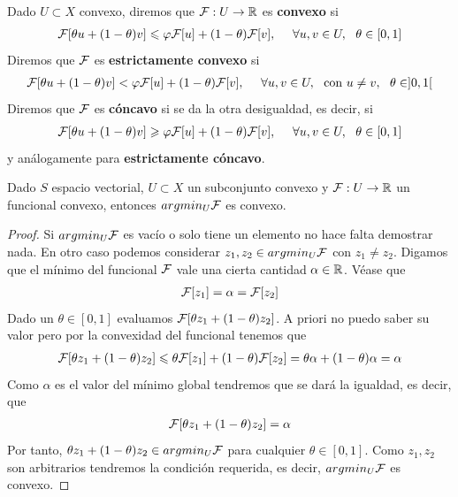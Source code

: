 \begin{definicion}
    Dado $U\subset X$ convexo, diremos que $\mathcal{F}:U\to \mathbb{R}$ es \textbf{convexo} si 
    \begin{gather*}
        \mathcal{F}[\theta u + (1-\theta)v] \leqslant \varphi \mathcal{F}[u] + (1-\theta)\mathcal{F}[v],\ \ \ \ \forall u,v\in U,\ \ \theta \in [0,1]
    \end{gather*}
    Diremos que $\mathcal{F}$ es \textbf{estrictamente convexo} si
    \begin{gather*}
        \cc{F}[\theta u + (1-\theta)v] < \varphi \cc{F}[u] + (1-\theta)\cc{F}[v],\ \ \ \ \forall u,v\in U,\ \text{ con } u\neq v,\ \ \theta \in ]0,1[
    \end{gather*}
    Diremos que $\mathcal{F}$ es \textbf{cóncavo} si se da la otra desigualdad, es decir, si
    \begin{gather*}
        \mathcal{F}[\theta u + (1-\theta)v] \geqslant \varphi \mathcal{F}[u] + (1-\theta)\mathcal{F}[v],\ \ \ \ \forall u,v\in U,\ \ \theta \in [0,1]
    \end{gather*}
    y análogamente para \textbf{estrictamente cóncavo}.
\end{definicion}

\begin{lema}
    Dado $S$ espacio vectorial, $U\subset X$ un subconjunto convexo y $\mathcal{F}:U\to \mathbb{R}$ un funcional convexo, entonces $argmin_U\mathcal{F}$ es convexo.

    \begin{proof}
        Si $argmin_U \mathcal{F}$ es vacío o solo tiene un elemento no hace falta demostrar nada. En otro caso podemos considerar $z_1,z_2\in argmin_U\mathcal{F}$ con $z_1\neq z_2$. Digamos que el mínimo del funcional $\mathcal{F}$ vale una cierta cantidad $\alpha\in \mathbb{R}$. Véase que
        \begin{gather*}
            \mathcal{F}[z_1] = \alpha = \mathcal{F}[z_2]
        \end{gather*}
        Dado un $\theta \in [0,1]$ evaluamos $\mathcal{F}[\theta z_1 + (1-\theta)z_2]$. A priori no puedo saber su valor pero por la convexidad del funcional tenemos que
        \begin{gather*}
            \mathcal{F}[\theta z_1 + (1-\theta)z_2] \leqslant \theta \mathcal{F}[z_1] + (1-\theta)\mathcal{F}[z_2] = \theta \alpha + (1-\theta) \alpha = \alpha
        \end{gather*} 
        Como $\alpha$ es el valor del mínimo global tendremos que se dará la igualdad, es decir, que 
        \begin{gather*}
            \mathcal{F}[\theta z_1 + (1-\theta)z_2] = \alpha
        \end{gather*} 
        Por tanto, $\theta z_1 + (1-\theta) z_2 \in argmin_U \mathcal{F}$ para cualquier $\theta \in [0,1]$. Como $z_1, z_2$ son arbitrarios tendremos la condición requerida, es decir, $argmin_U \mathcal{F}$ es convexo.
    \end{proof} 
\end{lema}

